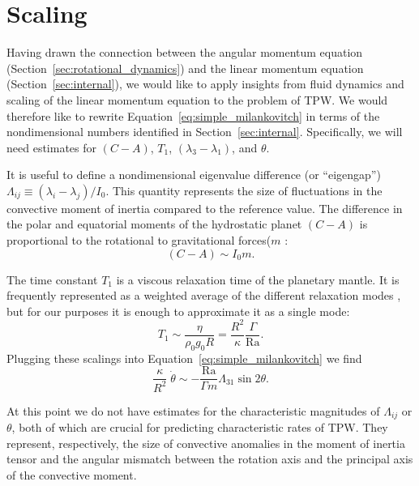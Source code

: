 \documentclass[extra,mreferee]{gji}
\begin{document}
\section{Scaling}
\label{sec:scaling}

Having drawn the connection between the angular momentum equation (Section~\ref{sec:rotational_dynamics}) and the linear momentum 
equation (Section~\ref{sec:internal}), we would like to apply insights from fluid dynamics and scaling of the 
linear momentum equation to the problem of TPW. We would therefore like to rewrite Equation~\eqref{eq:simple_milankovitch}
in terms of the nondimensional numbers identified in Section~\ref{sec:internal}.
Specifically, we will need estimates for $(C-A)$, $T_1$, $(\lambda_3-\lambda_1)$, and $\theta$. 

It is useful to define a nondimensional eigenvalue difference (or ``eigengap'') $\Lambda_{ij} \equiv (\lambda_i - \lambda_j)/I_0$.  
This quantity represents the size of fluctuations in the convective moment of inertia compared to the reference value.
The difference in the polar and equatorial moments of the hydrostatic planet $(C-A)$ is proportional to the rotational to gravitational forces($m$ \citep{munk1960rotation}:
\begin{equation}
(C-A) \sim I_0 m.
\end{equation}

The time constant $T_1$ is a viscous relaxation time of the planetary mantle. It is frequently represented as a weighted average of the different relaxation modes \citep[e.g.][]{ricard1993polar, greff2004upwelling}, but for our purposes it is enough to approximate it as a single mode:
\begin{equation}
T_1 \sim \frac{ \eta }{ \rho_0 g_0 R} = \frac{R^2}{\kappa} \frac{\Gamma}{\mathrm{Ra} }.
\end{equation}
Plugging these scalings into Equation~\eqref{eq:simple_milankovitch} we find
\begin{equation}
\frac{\kappa}{R^2} \; \dot{\theta} \sim - \frac{\mathrm{Ra}}{\Gamma m} \Lambda_{31} \sin{2 \theta}.
\label{eq:scaled_rotation}
\end{equation}

At this point we do not have estimates for the characteristic magnitudes of $\Lambda_{ij}$ or $\theta$, both of which are crucial for predicting characteristic rates of TPW.
They represent, respectively, the size of convective anomalies in the moment of inertia tensor and the angular mismatch between the rotation axis and the principal axis of the convective moment.
\end{document}
